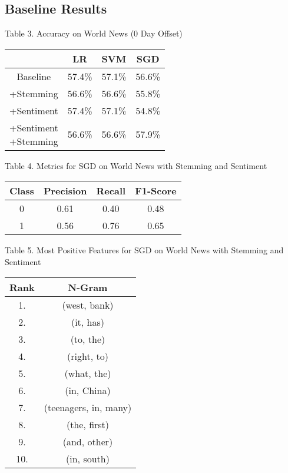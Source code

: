 \documentclass[11pt,a4paper]{article}
\begin{document}
\subsection{Baseline Results}
\begin{center}
Table 3. Accuracy on World News (0 Day Offset)
\begin{tabular}{ |c|c|c|c| }
 \hline
  & LR & SVM & SGD \\
 \hline
 Baseline & 57.4\% & 57.1\% & 56.6\% \\
  \hline
 +Stemming & 56.6\% & 56.6\% & 55.8\% \\
  \hline
 +Sentiment & 57.4\% & 57.1\%  & 54.8\% \\
  \hline
  \shortstack{+Sentiment \\ +Stemming} & 56.6\% & 56.6\% & 57.9\% \\
 \hline
\end{tabular}
\end{center}

\begin{center}
Table 4. Metrics for SGD on World News with Stemming and Sentiment
\begin{tabular}{ |c|c|c|c| }
 \hline
  Class & Precision & Recall & F1-Score\\
  \hline
  0 & 0.61 & 0.40 & 0.48\\
  \hline
  1 & 0.56 & 0.76 & 0.65\\
 \hline
\end{tabular}
\end{center}

\begin{center}
Table 5. Most Positive Features for SGD on World News with Stemming and Sentiment
\begin{tabular}{ |c|c| }
 \hline
 Rank & N-Gram\\
 \hline
 1. & (west, bank)\\
 2. & (it, has)\\
 3. & (to, the)\\
 4. & (right, to)\\
 5. & (what, the)\\
 6. & (in, China)\\
 7. & (teenagers, in, many)\\
 8. & (the, first)\\
 9. & (and, other)\\
 10. & (in, south)\\
 \hline
\end{tabular}
\end{center}
\end{document}
